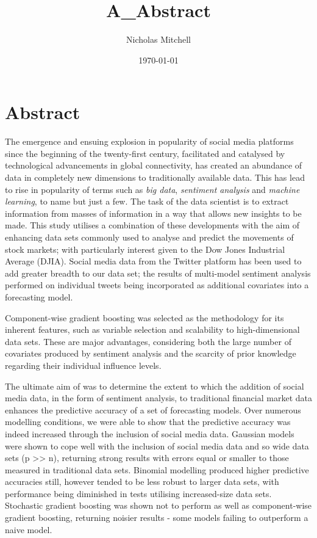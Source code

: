 \documentclass{article}
\author{Nicholas Mitchell}
\date{\today}
\title{A\_Abstract}
\begin{document}
\maketitle
\tableofcontents

\pagebreak


\section{Abstract}
\label{sec-1}

\vspace{10mm}

The emergence and ensuing explosion in popularity of social media platforms since the beginning of the twenty-first century, facilitated and catalysed by technological advancements in global connectivity, has created an abundance of data in completely new dimensions to traditionally available data. This has lead to rise in popularity of terms such as \emph{big data}, \emph{sentiment analysis} and \emph{machine learning}, to name but just a few. The task of the data scientist is to extract information from masses of information in a way that allows new insights to be made. This study utilises a combination of these developments with the aim of enhancing data sets commonly used to analyse and predict the movements of stock markets; with particularly interest given to the Dow Jones Industrial Average (DJIA). Social media data from the Twitter platform has been used to add greater breadth to our data set; the results of multi-model sentiment analysis performed on individual tweets being incorporated as additional covariates into a forecasting model.

Component-wise gradient boosting was selected as the methodology for its inherent features, such as variable selection and scalability to high-dimensional data sets. These are major advantages, considering both the large number of covariates produced by sentiment analysis and the scarcity of prior knowledge regarding their individual influence levels.

The ultimate aim of was to determine the extent to which the addition of social media data, in the form of sentiment analysis, to traditional financial market data enhances the predictive accuracy of a set of forecasting models. Over numerous modelling conditions, we were able to show that the predictive accuracy was indeed increased through the inclusion of social media data. Gaussian models were shown to cope well with the inclusion of social media data and so wide data sets (p >> n), returning strong results with errors equal or smaller to those measured in traditional data sets. Binomial modelling produced higher predictive accuracies still, however tended to be less robust to larger data sets, with performance being diminished in tests utilising increased-size data sets. Stochastic gradient boosting was shown not to perform as well as component-wise gradient boosting, returning noisier results - some models failing to outperform a naive model.

\pagebreak
\end{document}
